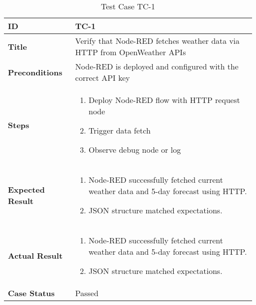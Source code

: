 \begin{table}[ht]
\centering
\begin{tabular}{|>{\raggedright\arraybackslash}p{4cm}|p{10cm}|}
\hline
\textbf{ID} & TC-1 \\
\hline
\textbf{Title} & Verify that Node-RED fetches weather data via HTTP from OpenWeather APIs \\
\hline
\textbf{Preconditions} & Node-RED is deployed and configured with the correct API key \\
\hline
\textbf{Steps} & \vspace{-20pt}
\begin{enumerate}
    \item Deploy Node-RED flow with HTTP request node
    \item Trigger data fetch
    \item Observe debug node or log
\end{enumerate} \\
\hline
\textbf{Expected Result} &  \vspace{-20pt}
\begin{enumerate}
    \item Node-RED successfully fetched current weather data and 5-day forecast using HTTP.
    \item JSON structure matched expectations.
\end{enumerate} \\
\hline
\textbf{Actual Result} &  \vspace{-20pt}
\begin{enumerate}
    \item Node-RED successfully fetched current weather data and 5-day forecast using HTTP.
    \item JSON structure matched expectations.
\end{enumerate} \\
\hline
\textbf{Case Status} & Passed \\
\hline
\end{tabular}
\caption{Test Case TC-1}
\label{tab:tc1}
\end{table}